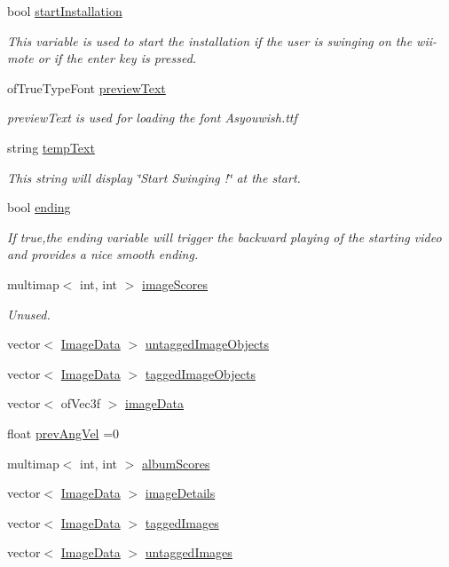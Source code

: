 \begin{DoxyCompactItemize}
bool \hyperlink{classtest_app_a8a65a6d1a473417cec1c2ac2e6116aae}{start\-Installation}
\begin{DoxyCompactList}\small\item\em This variable is used to start the installation if the user is swinging on the wii-\/mote or if the enter key is pressed. \end{DoxyCompactList}\item 
of\-True\-Type\-Font \hyperlink{classtest_app_af5b1af55af2256ef3751de075fc7a9cc}{preview\-Text}
\begin{DoxyCompactList}\small\item\em preview\-Text is used for loading the font Asyouwish.\-ttf \end{DoxyCompactList}\item 
string \hyperlink{classtest_app_ad9a4beab6f2e0f13d32b00b502e89bdc}{temp\-Text}
\begin{DoxyCompactList}\small\item\em This string will display \char`\"{}\-Start Swinging !\char`\"{} at the start. \end{DoxyCompactList}\item 
bool \hyperlink{classtest_app_acf09303bc452d2a38098f6bf94655408}{ending}
\begin{DoxyCompactList}\small\item\em If true,the ending variable will trigger the backward playing of the starting video and provides a nice smooth ending. \end{DoxyCompactList}\item 
multimap$<$ int, int $>$ \hyperlink{classtest_app_a9ced1a64554a911109fe8a975b95b590}{image\-Scores}
\begin{DoxyCompactList}\small\item\em Unused. \end{DoxyCompactList}\item 
vector$<$ \hyperlink{struct_image_data}{Image\-Data} $>$ \hyperlink{classtest_app_ae31cc868f554f62b4c6e4e9db3b4155b}{untagged\-Image\-Objects}
\item 
vector$<$ \hyperlink{struct_image_data}{Image\-Data} $>$ \hyperlink{classtest_app_af65c8dc2f4620bfe7fdf6a39043cb48d}{tagged\-Image\-Objects}
\item 
vector$<$ of\-Vec3f $>$ \hyperlink{classtest_app_a500cd1228b3364bf30c8fb185e375688}{image\-Data}
\item 
float \hyperlink{classtest_app_a8a2b9b9cf76097e20f148b616297029b}{prev\-Ang\-Vel} =0
\item 
multimap$<$ int, int $>$ \hyperlink{classtest_app_aa16e3bba73f9adb3c6363ac429e5a472}{album\-Scores}
\item 
vector$<$ \hyperlink{struct_image_data}{Image\-Data} $>$ \hyperlink{classtest_app_adcd4c3dfc7257326a79e6a3fc8b33406}{image\-Details}
\item 
vector$<$ \hyperlink{struct_image_data}{Image\-Data} $>$ \hyperlink{classtest_app_a7f7226fc54fdb7d06366ed0fa3ab7ee3}{tagged\-Images}
\item 
vector$<$ \hyperlink{struct_image_data}{Image\-Data} $>$ \hyperlink{classtest_app_a9cb9aa0700c4c8b316329a86c4e650ec}{untagged\-Images}
\end{DoxyCompactItemize}


